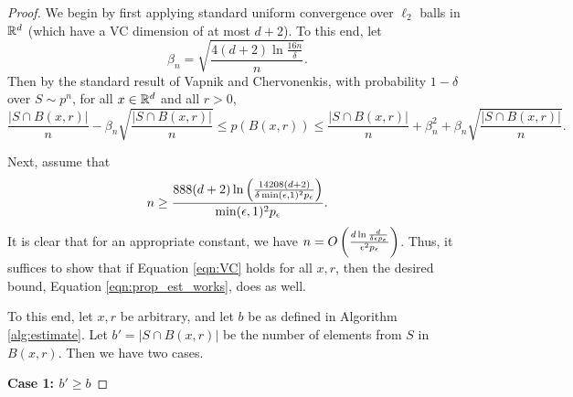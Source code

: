 \begin{proof}
We begin by first applying standard uniform convergence over $\ell_2$ balls in $\mathbb{R}^d$ (which have a VC dimension of at most $d+2$). To this end, let $$\beta_n = \sqrt{\frac{4(d+2)\ln \frac{16n}{\delta}}{n}}.$$ Then by the standard result of Vapnik and Chervonenkis, with probability $1-\delta$ over $S \sim p^n$, for all $x \in \mathbb{R}^d$ and all $r > 0$, 
\begin{equation}\label{eqn:VC}
\frac{|S \cap B(x,r)|}{n} - \beta_n\sqrt{\frac{|S \cap B(x,r)|}{n}} \leq p(B(x,r)) \leq \frac{|S \cap B(x,r)|}{n} + \beta_n^2 + \beta_n\sqrt{\frac{|S \cap B(x,r)|}{n}}.
\end{equation}

Next, assume that 
\begin{equation}\label{eqn:bound_n}
n \geq \frac{888(d+2)\ln \left(\frac{14208(d+2)}{\delta \min(\epsilon,1)^2 p_\epsilon} \right)}{\min(\epsilon,1)^2 p_\epsilon}.
\end{equation} 
It is clear that for an appropriate constant, we have $n = O \left(\frac{d\ln\frac{d}{\delta\epsilon p_\epsilon}}{\epsilon^2 p_\epsilon} \right)$. Thus, it suffices to show that if Equation \ref{eqn:VC} holds for all $x, r$, then the desired bound,  Equation \ref{eqn:prop_est_works}, does as well. 

To this end, let $x, r$ be arbitrary, and let $b$ be as defined in Algorithm \ref{alg:estimate}. Let $b' = |S \cap B(x, r)|$ be the number of elements from $S$ in $B(x, r)$. Then we have two cases.

\textbf{Case 1: $b' \geq b$}


\end{proof}
